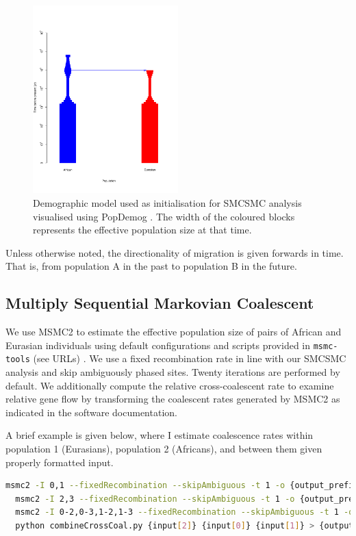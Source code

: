 \begin{figure}
	\centering
	\includegraphics[width=0.5\textwidth]{plot/dem_smc2.pdf}
	\caption[SMCSMC seed demographic model]{Demographic model used as initialisation for SMCSMC analysis visualised using PopDemog \cite{Zhou2018}. The width of the coloured blocks represents the effective population size at that time.}
	\label{fig:smc2demog}
\end{figure}

Unless otherwise noted, the directionality of migration is given forwards in time. That is, from population A in the past to population B in the future. 


\subsection{Multiply Sequential Markovian Coalescent} We use MSMC2 to estimate the effective population size of pairs of African and Eurasian individuals using default configurations and scripts provided in {\tt msmc-tools} (see URLs) \cite{Schiffels2014, Wang2019a}. We use a fixed recombination rate in line with our SMCSMC analysis and skip ambiguously phased sites. Twenty iterations are performed by default. We additionally compute the relative cross-coalescent rate to examine relative gene flow by transforming the coalescent rates generated by MSMC2 as indicated in the software documentation.

A brief example is given below, where I estimate coalescence rates within population 1 (Eurasians), population 2 (Africans), and between them given properly formatted input. 

\begin{lstlisting}[language=Bash]
  msmc2 -I 0,1 --fixedRecombination --skipAmbiguous -t 1 -o {output_prefix} {input_string}
  msmc2 -I 2,3 --fixedRecombination --skipAmbiguous -t 1 -o {output_prefix} {input_string}
  msmc2 -I 0-2,0-3,1-2,1-3 --fixedRecombination --skipAmbiguous -t 1 -o {output_prefix} {input_string}
  python combineCrossCoal.py {input[2]} {input[0]} {input[1]} > {output[0]}
\end{lstlisting}

